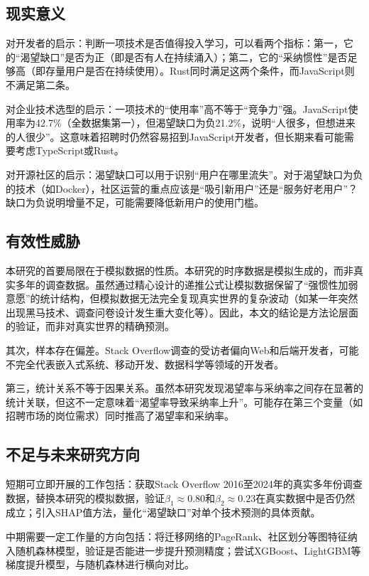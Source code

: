 \documentclass[fontset=windows]{cjc}
\begin{document}
\subsection{现实意义}
对开发者的启示：判断一项技术是否值得投入学习，可以看两个指标：第一，它的“渴望缺口”是否为正（即是否有人在持续涌入）；第二，它的“采纳惯性”是否足够高（即存量用户是否在持续使用）。Rust同时满足这两个条件，而JavaScript则不满足第二条。

对企业技术选型的启示：一项技术的“使用率”高不等于“竞争力”强。JavaScript使用率为42.7\%（全数据集第一），但渴望缺口为负21.2\%，说明“人很多，但想进来的人很少”。这意味着招聘时仍然容易招到JavaScript开发者，但长期来看可能需要考虑TypeScript或Rust。

对开源社区的启示：渴望缺口可以用于识别“用户在哪里流失”。对于渴望缺口为负的技术（如Docker），社区运营的重点应该是“吸引新用户”还是“服务好老用户”？缺口为负说明增量不足，可能需要降低新用户的使用门槛。

\subsection{有效性威胁}
本研究的首要局限在于模拟数据的性质。本研究的时序数据是模拟生成的，而非真实多年的调查数据。虽然通过精心设计的递推公式让模拟数据保留了“强惯性加弱意愿”的统计结构，但模拟数据无法完全复现真实世界的复杂波动（如某一年突然出现黑马技术、调查问卷设计发生重大变化等）。因此，本文的结论是方法论层面的验证，而非对真实世界的精确预测。

其次，样本存在偏差。Stack Overflow调查的受访者偏向Web和后端开发者，可能不完全代表嵌入式系统、移动开发、数据科学等领域的开发者。

第三，统计关系不等于因果关系。虽然本研究发现渴望率与采纳率之间存在显著的统计关联，但这不一定意味着“渴望率导致采纳率上升”。可能存在第三个变量（如招聘市场的岗位需求）同时推高了渴望率和采纳率。

\subsection{不足与未来研究方向}
短期可立即开展的工作包括：获取Stack Overflow 2016至2024年的真实多年份调查数据，替换本研究的模拟数据，验证$\beta_1\approx0.80$和$\beta_2\approx0.23$在真实数据中是否仍然成立；引入SHAP值方法，量化“渴望缺口”对单个技术预测的具体贡献。

中期需要一定工作量的方向包括：将迁移网络的PageRank、社区划分等图特征纳入随机森林模型，验证是否能进一步提升预测精度；尝试XGBoost、LightGBM等梯度提升模型，与随机森林进行横向对比。
\end{document}

